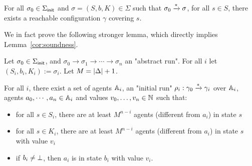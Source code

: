 \begin{lemma}
	\label{cor:soundness}
	For all $\sigma_0 \in \Sigma_{\mathsf{init}}$ and $\sigma = (S, b, K) \in \Sigma$ such that $\sigma_0 \xrightarrow{*} \sigma$, for all $s \in S$, there exists a reachable configuration $\gamma$ covering $s$.
\end{lemma}


We in fact prove the following stronger lemma, which directly implies Lemma~\ref{cor:soundness}.

\begin{lemma}
	\label{lem:correctness-construction}
	
	
	Let $\sigma_0 \in \Sigma_{\mathsf{init}}$, and $\sigma_0 \to \sigma_1 \to \cdots \to \sigma_n$ an "abstract run". For all $i$ let $(S_i, b_i, K_i) := \sigma_i$. Let $M = |\Delta|+1$.
	
	For all $i$, there exist a set of agents $\mathbb{A}_i$, an "initial run" $\rho_i : \gamma_0 \xrightarrow{*} \gamma_i$ over $\mathbb{A}_i$, agents $a_0, \cdots, a_n \in \mathbb{A}_i$ and values $v_0, \ldots, v_n \in \mathbb{N}$ such that:
	\begin{itemize}
		\item for all $s \in S_i$, there are at least $M^{n-i}$ agents (different from $a_i$) in state $s$ 
		
		\item for all $s \in K_i$, there are at least $M^{n-i}$ agents (different from $a_i$) in state $s$ with value $v_i$
		
		\item if $b_i \neq \bot$, then $a_i$ is in state $b_i$ with value $v_i$.
	\end{itemize}
\end{lemma}


